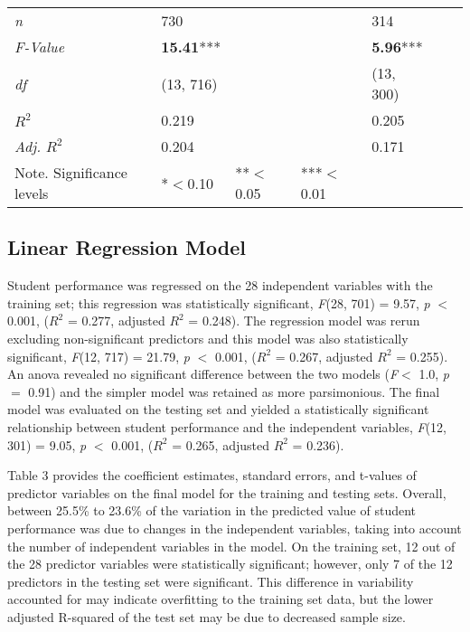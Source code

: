 \documentclass[sigconf]{acmart}
\begin{document}
\begin{table*}[ht]
\begin{tabular}{lllllll}
    \midrule
    \textit{n}          &       730          &       &        &         314         &       &       \\
    \textit{F-Value}    & \textbf{15.41}***  &       &        & \textbf{5.96}***    &       &       \\
    \textit{df}         &   (13, 716)        &       &        &      (13, 300)      &       &       \\
    \textit{$R^2$}      &      0.219         &       &        &         0.205       &       &       \\ 
    \textit{Adj. $R^2$} &      0.204         &       &        &         0.171       &       &       \\
    \bottomrule
    Note. Significance levels & *$<$0.10      & **$<$0.05  & ***$<$0.01 & & &
  \end{tabular}
\end{table*}



\subsection{Linear Regression Model}




Student performance was regressed on the 28 independent 
variables with the training set; this regression was statistically significant, 
\textit{F}(28, 701) = 9.57, \textit{p} $<$ 0.001, ($R^2$ = 0.277, adjusted 
$R^2$ = 0.248). The regression model was rerun excluding non-significant 
predictors and this model was also statistically significant,
\textit{F}(12, 717) = 21.79, \textit{p} $<$ 0.001, ($R^2$ = 0.267, adjusted 
$R^2$ = 0.255). An anova revealed no significant difference between the two 
models (\textit{F}$<$ 1.0, \textit{p} $=$ 0.91) and the simpler model was 
retained as more parsimonious. The final model was evaluated on the testing 
set and yielded a statistically significant relationship between student 
performance and the independent variables, \textit{F}(12, 301) = 9.05, 
\textit{p} $<$ 0.001, ($R^2$ = 0.265, adjusted $R^2$ = 0.236). 

Table 3 provides the coefficient estimates, standard errors, and t-values of 
predictor variables on the final model for the training and testing sets.
Overall, between 25.5\% to 23.6\% of the variation in the predicted value of 
student performance was due to changes in the independent variables, taking 
into account the number of independent variables in the model. On the training 
set, 12 out of the 28 predictor variables were statistically significant; 
however, only 7 of the 12 predictors in the testing set were significant. 
This difference in variability accounted for may indicate overfitting to the 
training set data, but the lower adjusted R-squared of the test set may be 
due to decreased sample size. 
\end{document}
